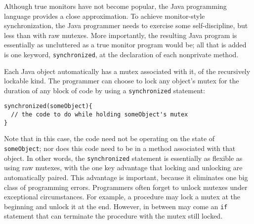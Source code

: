 Although true monitors have not become popular, the Java programming
language provides a close approximation.  To achieve monitor-style
synchronization, the Java programmer needs to exercise some self-discipline, but less than with raw mutexes.  More importantly, the
resulting Java program is essentially as uncluttered as a true monitor
program would be; all that is added is one keyword,
\verb|synchronized|, at the declaration of each nonprivate method.

Each Java object automatically has a mutex associated with it, of the
recursively lockable kind.  The programmer can choose to lock any
object's mutex for the duration of any block of code by using a
\verb|synchronized| statement:
\begin{verbatim}
synchronized(someObject){
  // the code to do while holding someObject's mutex
}
\end{verbatim}
Note that in this case, the code need not be operating on the state of
\verb|someObject|; nor does this code need to be in a method
associated with that object.  In other words, the \verb|synchronized|
statement is essentially as flexible as using raw mutexes, with the
one key advantage that locking and unlocking are automatically paired.
This advantage is important, because it eliminates one big class of
programming errors.  Programmers often forget to unlock mutexes under
exceptional circumstances.  For example, a procedure may lock a mutex
at the beginning and unlock it at the end.  However, in between may
come an \verb|if| statement that can terminate the procedure with
the mutex still locked.

